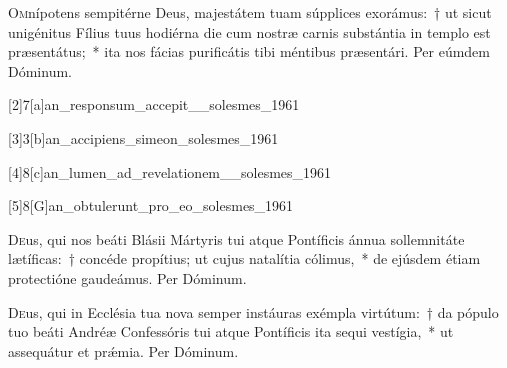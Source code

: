 \documentclass[vesperale_romanum.tex]{subfiles}
\begin{document}
\lettrine{O}{m}nípotens sempitérne Deus, majestátem tuam súpplices exorámus:~† ut sicut unigénitus Fílius tuus hodiérna die cum nostræ carnis substántia in templo est præsentátus;~* ita nos fácias purificátis tibi méntibus præsentári.
Per eúmdem Dóminum.



[2]{7}[a]{an_responsum_accepit__solesmes_1961} 

[3]{3}[b]{an_accipiens_simeon_solesmes_1961}

[4]{8}[c]{an_lumen_ad_revelationem__solesmes_1961}

[5]{8}[G]{an_obtulerunt_pro_eo_solesmes_1961}






\myrule



\oratio

\lettrine{D}{e}us, qui nos beáti Blásii Mártyris tui atque Pontíficis ánnua sollemnitáte lætíficas:~† concéde propítius; ut cujus natalítia cólimus,~* de ejúsdem étiam prote\-ctióne gaudeámus.
Per Dóminum.

\myrule


\duplexmtv

\oratio

\lettrine{D}{e}us, qui in Ecclésia tua nova semper instáuras exémpla virtútum:~† da pópulo tuo beáti Andréæ Confessóris tui atque Pontíficis ita sequi vestígia,~* ut assequátur et prǽmia. Per Dóminum.
\end{document}
